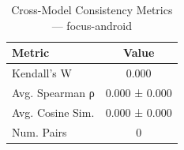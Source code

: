\begin{table}[htbp]
\centering
\caption{Cross-Model Consistency Metrics — focus-android}
\label{tab:exp2_consistency_focus-android}
\begin{tabular}{lc}
\toprule
\textbf{Metric} & \textbf{Value} \\
\midrule
Kendall's W & 0.000 \\
Avg. Spearman ρ & 0.000 ± 0.000 \\
Avg. Cosine Sim. & 0.000 ± 0.000 \\
Num. Pairs & 0 \\
\bottomrule
\end{tabular}
\end{table}